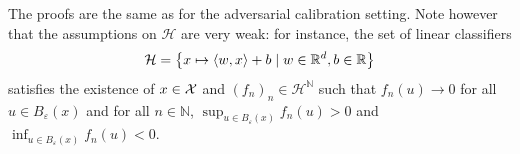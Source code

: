 The proofs are the same as for the adversarial calibration setting. Note however that the assumptions on $\mathcal{H}$ are very weak: for instance, the set of linear classifiers 
\begin{align*}
    \mathcal{H}=\left\{x\mapsto \langle w,x\rangle +b\mid w\in\RR^d,b\in \RR \right\}
\end{align*}
satisfies the existence of $x\in\mathcal{X}$ and $(f_n)_n\in\mathcal{H}^\mathbb{N}$ such that $f_n(u)\to 0$ for all $ u\in B_\varepsilon(x)$ and for all $n\in\mathbb{N}$, $\sup_{u\in B_\varepsilon(x)} f_n(u)>0$ and  $\inf_{u\in B_\varepsilon(x)} f_n(u)<0$. 